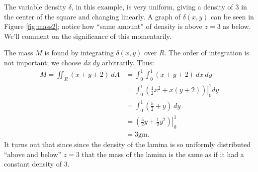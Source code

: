 {The variable density $\delta$, in this example, is very uniform, giving a density of 3 in the center of the square and changing linearly. A graph of $\delta(x,y)$ can be seen in Figure \ref{fig:mass2}; notice how ``same amount'' of density is above $z=3$ as below. We'll comment on the significance of this momentarily.

The mass $M$ is found by integrating $\delta(x,y)$ over $R$. The order of integration is not important; we choose $dx\ dy$ arbitrarily. Thus:
\begin{align*}
M = \iint_R(x+y+2)\ dA &= \int_0^1\int_0^1 (x+y+2)\ dx\ dy\\
		&= \int_0^1\left.\left(\frac 12x^2+x(y+2)\right)\right|_0^1dy\\
		&= \int_0^1 \left(\frac52+y\right)\ dy\\
		&= \left.\left(\frac52y+\frac12y^2\right)\right|_0^1\\
		&= 3\text{gm}.
\end{align*}
It turns out that since since the density of the lamina is so uniformly distributed ``above and below'' $z=3$ that the mass of the lamina is the same as if it had a constant density of 3.
}\\

